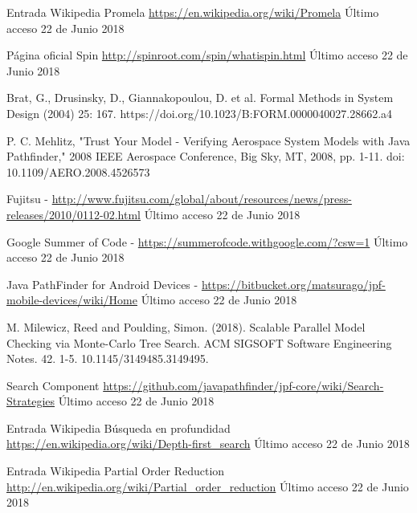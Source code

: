 \documentclass[runningheads]{llncs}
\begin{document}
%
%
%
% 
% 
%

\begin{thebibliography}{8}
Entrada Wikipedia Promela \url{https://en.wikipedia.org/wiki/Promela} \'Ultimo acceso 22 de Junio 2018

P\'agina oficial Spin \url{http://spinroot.com/spin/whatispin.html} \'Ultimo acceso 22 de Junio 2018

Brat, G., Drusinsky, D., Giannakopoulou, D. et al. Formal Methods in System Design (2004) 25: 167. https://doi.org/10.1023/B:FORM.0000040027.28662.a4

P. C. Mehlitz, "Trust Your Model - Verifying Aerospace System Models with Java Pathfinder," 2008 IEEE Aerospace Conference, Big Sky, MT, 2008, pp. 1-11.
doi: 10.1109/AERO.2008.4526573

Fujitsu - \url{http://www.fujitsu.com/global/about/resources/news/press-releases/2010/0112-02.html} \'Ultimo acceso 22 de Junio 2018

Google Summer of Code - \url{https://summerofcode.withgoogle.com/?csw=1} \'Ultimo acceso 22 de Junio 2018

Java PathFinder for Android Devices - \url{https://bitbucket.org/matsurago/jpf-mobile-devices/wiki/Home} \'Ultimo acceso 22 de Junio 2018

M. Milewicz, Reed and Poulding, Simon. (2018). Scalable Parallel Model Checking via Monte-Carlo Tree Search. ACM SIGSOFT Software Engineering Notes. 42. 1-5. 10.1145/3149485.3149495. 


Search Component \url{https://github.com/javapathfinder/jpf-core/wiki/Search-Strategies} \'Ultimo acceso 22 de Junio 2018

Entrada Wikipedia B\'usqueda en profundidad \url{https://en.wikipedia.org/wiki/Depth-first\_search} \'Ultimo acceso 22 de Junio 2018

Entrada Wikipedia Partial Order Reduction \url{http://en.wikipedia.org/wiki/Partial\_order\_reduction} \'Ultimo acceso 22 de Junio 2018

\end{thebibliography}
\end{document}
